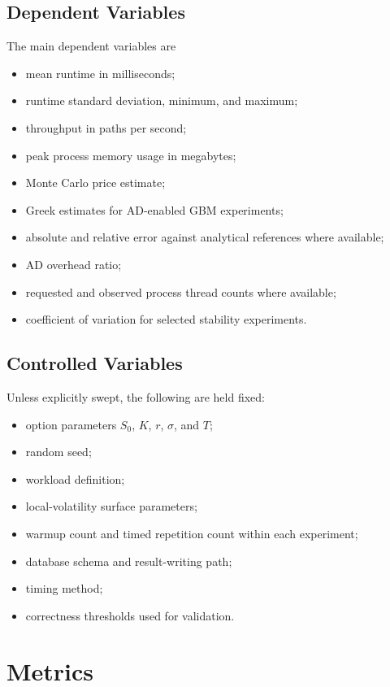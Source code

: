 \subsection{Dependent Variables}

The main dependent variables are

\begin{itemize}
    \item mean runtime in milliseconds;
    \item runtime standard deviation, minimum, and maximum;
    \item throughput in paths per second;
    \item peak process memory usage in megabytes;
    \item Monte Carlo price estimate;
    \item Greek estimates for AD-enabled GBM experiments;
    \item absolute and relative error against analytical references where
    available;
    \item AD overhead ratio;
    \item requested and observed process thread counts where available;
    \item coefficient of variation for selected stability experiments.
\end{itemize}

\subsection{Controlled Variables}

Unless explicitly swept, the following are held fixed:

\begin{itemize}
    \item option parameters \(S_0\), \(K\), \(r\), \(\sigma\), and \(T\);
    \item random seed;
    \item workload definition;
    \item local-volatility surface parameters;
    \item warmup count and timed repetition count within each experiment;
    \item database schema and result-writing path;
    \item timing method;
    \item correctness thresholds used for validation.
\end{itemize}

\section{Metrics}
\label{sec:exp-metrics}

